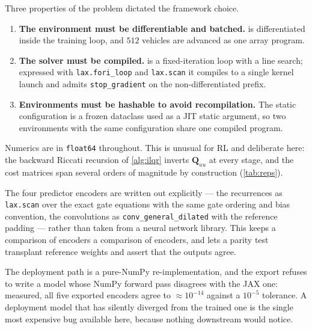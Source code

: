 \documentclass[11pt,a4paper,twoside,openright]{report}
\makeatletter
\renewcommand{\subsection}{\FloatBarrier\old@subsection}}
\newcommand{\mat}[1]{\bm{#1}}
\theoremstyle{plain}
\theoremstyle{definition}
\theoremstyle{remark}
\makeatother
\begin{document}
	\subsection{Why JAX}

	Three properties of the problem dictated the framework choice.

	\begin{enumerate}[leftmargin=*]
		\item \textbf{The environment must be differentiable and batched.}
		 is differentiated inside the training loop, and $512$ vehicles
		are advanced as one array program.
		\item \textbf{The solver must be compiled.}  is a fixed-iteration
		loop with a line search; expressed with \texttt{lax.fori\_loop} and
		\texttt{lax.scan} it compiles to a single kernel launch and admits
		\texttt{stop\_gradient} on the non-differentiated prefix.
		\item \textbf{Environments must be hashable to avoid recompilation.} The static
		configuration is a frozen dataclass used as a JIT static argument, so two
		environments with the same configuration share one compiled program.
	\end{enumerate}

	Numerics are in \texttt{float64} throughout. This is unusual for RL and
	deliberate here: the backward Riccati recursion of \cref{alg:ilqr} inverts
	$\mat Q_{uu}$ at every stage, and the cost matrices span several orders of
	magnitude by construction (\cref{tab:reps}).

	\subsection{Numerical parity and export}

	The four predictor encoders are written out explicitly --- the recurrences as
	\texttt{lax.scan} over the exact gate equations with the same gate ordering and
	bias convention, the convolutions as \texttt{conv\_general\_dilated} with the
	reference padding --- rather than taken from a neural network library. This
	keeps a comparison of encoders a comparison of encoders, and lets a parity test
	transplant reference weights and assert that the outputs agree.

	The deployment path is a pure-NumPy re-implementation, and the export refuses to
	write a model whose NumPy forward pass disagrees with the JAX one: measured, all
	five exported encoders agree to $\approx10^{-14}$ against a $10^{-5}$ tolerance.
	A deployment model that has silently diverged from the trained one is the single
	most expensive bug available here, because nothing downstream would notice.
\end{document}
